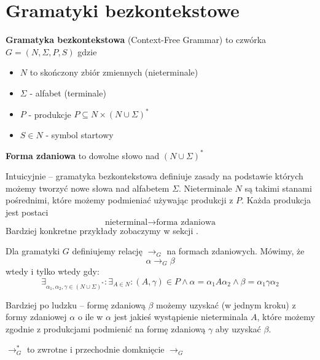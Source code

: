 \section{Gramatyki bezkontekstowe}

\begin{definition}
	\textbf{Gramatyka bezkontekstowa} (Context-Free Grammar) to czwórka \( G = (N, \Sigma, P, S) \) gdzie
	\begin{itemize}
		\item \( N \) to skończony zbiór zmiennych (nieterminale)
		\item \( \Sigma \) - alfabet (terminale)
		\item \( P \) - produkcje \( P \subseteq N \times (N \cup \Sigma)^* \)
		\item \( S \in N \) - symbol startowy
	\end{itemize}
\end{definition}

\begin{definition}
	\textbf{Forma zdaniowa} to dowolne słowo nad \( (N \cup \Sigma)^* \)
\end{definition}

Intuicyjnie -- gramatyka bezkontekstowa definiuje zasady na podstawie których możemy tworzyć nowe słowa nad alfabetem \( \Sigma \).
Nieterminale \( N \) są takimi stanami pośrednimi, które możemy podmieniać używając produkcji z \( P \).
Każda produkcja jest postaci
\[
	\text{nieterminal} \rightarrow \text{forma zdaniowa}
\]
Bardziej konkretne przykłady zobaczymy w sekcji .


\begin{definition}
	Dla gramatyki \( G \) definiujemy relację \( \rightarrow_G \) na formach zdaniowych.
	Mówimy, że
	\[
		\alpha \rightarrow_G \beta
	\]
	wtedy i tylko wtedy gdy:
	\[
		\exists_{\alpha_1, \alpha_2, \gamma \in (N \cup \Sigma)^*} : \exists_{A \in N} : (A, \gamma) \in P \land
		\alpha = \alpha_1  A \alpha_2 \land \beta = \alpha_1 \gamma \alpha_2
	\]
\end{definition}

Bardziej po ludzku -- formę zdaniową \( \beta \) możemy uzyskać (w jednym kroku) z formy zdaniowej \( \alpha \) o ile w  \( \alpha \) jest jakieś wystąpienie nieterminala \( A \), które możemy zgodnie z produkcjami podmienić na formę zdaniową \( \gamma \) aby uzyskać \( \beta \).

\begin{definition}
	\( \rightarrow_G^* \) to zwrotne i przechodnie domknięcie \( \rightarrow_G \)
\end{definition}

